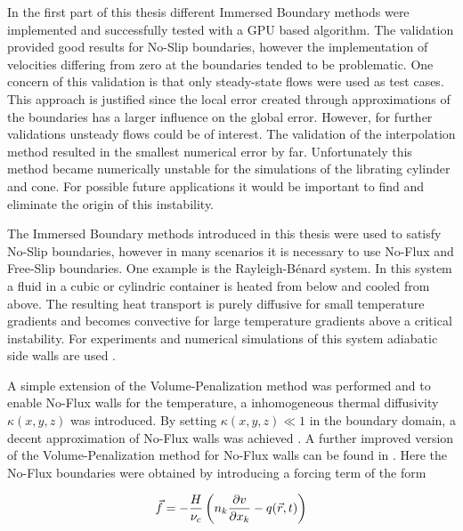 
In the first part of this thesis different Immersed Boundary methods were
implemented and successfully tested with a GPU based algorithm.
The validation provided good results for No-Slip boundaries, however the implementation of velocities differing from zero at the boundaries tended to be problematic.
One concern of this validation is that only steady-state flows were used as test cases.
This approach is justified since the local error created through approximations of the boundaries
has a larger influence on the global error.
However, for further validations unsteady flows could be of interest.
The validation of the interpolation method resulted in the smallest numerical error by far.
Unfortunately this method became numerically unstable for the simulations of the librating cylinder and cone.
For possible future applications it would be important to find and eliminate the origin of this instability.

The Immersed Boundary methods introduced in this thesis were used to satisfy No-Slip boundaries, however
in many scenarios it is necessary to use No-Flux and Free-Slip boundaries.
One example is the Rayleigh-B\'{e}nard system.
In this system a fluid in a cubic or cylindric container is heated from below and cooled from above.
The resulting heat transport is purely diffusive for small temperature gradients and
becomes convective for large temperature gradients above a critical instability.
For experiments and numerical simulations of this system adiabatic side walls are used \citep{Lulff2011}.

A simple extension of the Volume-Penalization method was performed \citep{Lulff2011} and
to enable No-Flux walls for the temperature, a inhomogeneous thermal diffusivity $\kappa (x, y, z)$ was introduced.
By setting $\kappa(x, y, z) \ll 1$ in the boundary domain, a decent approximation of No-Flux walls  was achieved \citep{Lulff2011}.
A further improved version of the Volume-Penalization method for No-Flux walls can be found in \citep{Brown-Dymkoski2014}.
Here the No-Flux boundaries were obtained by introducing a forcing term of the form

\begin{align}
    \vec{f}  = -\frac{H}{\nu_c}\left( n_k\pdn[v]{x_k} - q(\vec{r}, t) \right)
\end{align}

